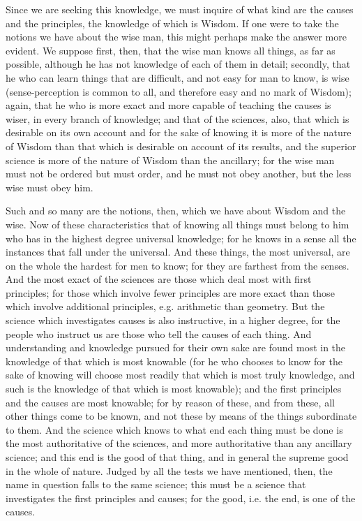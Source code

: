 \documentclass{article}
\begin{document}
Since we are seeking this knowledge, we must inquire of what kind are the causes and the principles, the knowledge of which is Wisdom. If one were to take the notions we have about the wise man, this might perhaps make the answer more evident. We suppose first, then, that the wise man knows all things, as far as possible, although he has not knowledge of each of them in detail; secondly, that he who can learn things that are difficult, and not easy for man to know, is wise (sense-perception is common to all, and therefore easy and no mark of Wisdom); again, that he who is more exact and more capable of teaching the causes is wiser, in every branch of knowledge; and that of the sciences, also, that which is desirable on its own account and for the sake of knowing it is more of the nature of Wisdom than that which is desirable on account of its results, and the superior science is more of the nature of Wisdom than the ancillary; for the wise man must not be ordered but must order, and he must not obey another, but the less wise must obey him.

Such and so many are the notions, then, which we have about Wisdom and the wise. Now of these characteristics that of knowing all things must belong to him who has in the highest degree universal knowledge; for he knows in a sense all the instances that fall under the universal. And these things, the most universal, are on the whole the hardest for men to know; for they are farthest from the senses. And the most exact of the sciences are those which deal most with first principles; for those which involve fewer principles are more exact than those which involve additional principles, e.g. arithmetic than geometry. But the science which investigates causes is also instructive, in a higher degree, for the people who instruct us are those who tell the causes of each thing. And understanding and knowledge pursued for their own sake are found most in the knowledge of that which is most knowable (for he who chooses to know for the sake of knowing will choose most readily that which is most truly knowledge, and such is the knowledge of that which is most knowable); and the first principles and the causes are most knowable; for by reason of these, and from these, all other things come to be known, and not these by means of the things subordinate to them. And the science which knows to what end each thing must be done is the most authoritative of the sciences, and more authoritative than any ancillary science; and this end is the good of that thing, and in general the supreme good in the whole of nature. Judged by all the tests we have mentioned, then, the name in question falls to the same science; this must be a science that investigates the first principles and causes; for the good, i.e. the end, is one of the causes.
\end{document}
